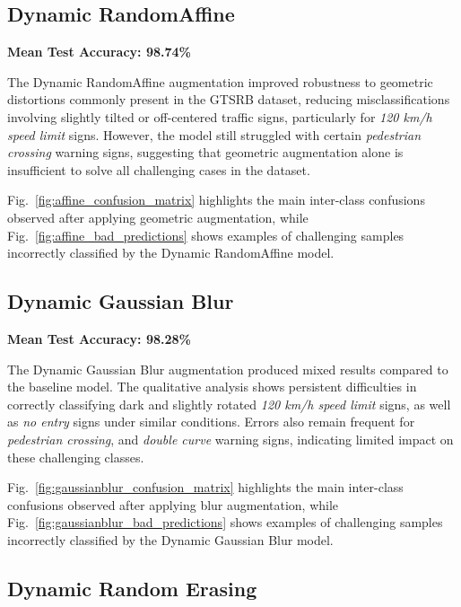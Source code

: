 \documentclass[conference]{IEEEtran}
\begin{document}
\subsection{Dynamic RandomAffine}

\textbf{Mean Test Accuracy: 98.74\%}

The Dynamic RandomAffine augmentation improved robustness to geometric distortions commonly present in the GTSRB dataset, reducing misclassifications involving slightly tilted or off-centered traffic signs, particularly for \textit{120 km/h speed limit} signs. However, the model still struggled with certain \textit{pedestrian crossing} warning signs, suggesting that geometric augmentation alone is insufficient to solve all challenging cases in the dataset.

Fig.~\ref{fig:affine_confusion_matrix} highlights the main inter-class confusions observed after applying geometric augmentation, while Fig.~\ref{fig:affine_bad_predictions} shows examples of challenging samples incorrectly classified by the Dynamic RandomAffine model.








\subsection{Dynamic Gaussian Blur}

\textbf{Mean Test Accuracy: 98.28\%}

The Dynamic Gaussian Blur augmentation produced mixed results compared to the baseline model. The qualitative analysis shows persistent difficulties in correctly classifying dark and slightly rotated \textit{120 km/h speed limit} signs, as well as \textit{no entry} signs under similar conditions. Errors also remain frequent for \textit{pedestrian crossing}, and \textit{double curve} warning signs, indicating limited impact on these challenging classes.

Fig.~\ref{fig:gaussianblur_confusion_matrix} highlights the main inter-class confusions observed after applying blur augmentation, while Fig.~\ref{fig:gaussianblur_bad_predictions} shows examples of challenging samples incorrectly classified by the Dynamic Gaussian Blur model.






\subsection{Dynamic Random Erasing}
\end{document}
